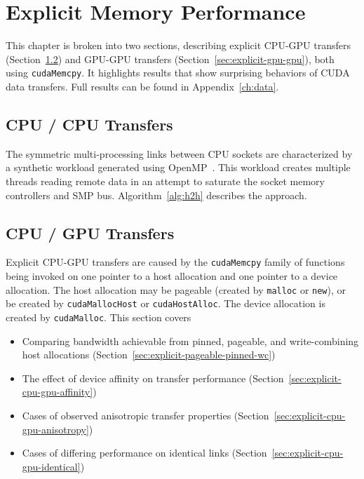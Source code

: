 \chapter{Explicit Memory Performance}
\label{ch:explicit}


This chapter is broken into two sections, describing explicit CPU-GPU transfers (Section~\ref{sec:explicit-cpu-gpu}) and GPU-GPU transfers (Section~\ref{sec:explicit-gpu-gpu}), both using \texttt{cudaMemcpy}.
It highlights results that show surprising behaviors of CUDA data transfers.
Full results can be found in Appendix~\ref{ch:data}.

\section{CPU / CPU Transfers}
\label{sec:explicit-cpu-cpu}

The symmetric multi-processing links between CPU sockets are characterized by a synthetic workload generated using OpenMP~\cite{openmp2013}.
This workload creates multiple threads reading remote data in an attempt to saturate the socket memory controllers and SMP bus.
Algorithm~\ref{alg:h2h} describes the approach.



\section{CPU / GPU Transfers}
\label{sec:explicit-cpu-gpu}

Explicit CPU-GPU transfers are caused by the \texttt{cudaMemcpy} family of functions being invoked on one pointer to a host allocation and one pointer to a device allocation.
The host allocation may be pageable (created by \texttt{malloc} or \texttt{new}), or be created by \texttt{cudaMallocHost} or \texttt{cudaHostAlloc}.
The device allocation is created by \texttt{cudaMalloc}.
This section covers
\begin{itemize}
\item Comparing bandwidth achievable from pinned, pageable, and write-combining host allocations (Section~\ref{sec:explicit-pageable-pinned-wc})
\item The effect of device affinity on transfer performance (Section~\ref{sec:explicit-cpu-gpu-affinity})
\item Cases of observed anisotropic transfer properties (Section~\ref{sec:explicit-cpu-gpu-anisotropy})
\item Cases of differing performance on identical links (Section~\ref{sec:explicit-cpu-gpu-identical})
\end{itemize}

